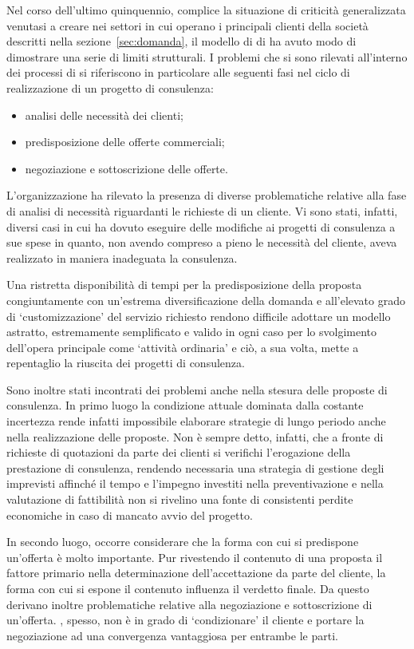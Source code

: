Nel corso dell'ultimo quinquennio, complice la situazione di criticità generalizzata venutasi a creare nei settori in cui operano i principali clienti della società descritti nella sezione~\ref{sec:domanda}, il modello di \bsn di \customer ha avuto modo di dimostrare una serie di limiti strutturali. I problemi che si sono rilevati all'interno dei processi di \customer si riferiscono in particolare alle seguenti fasi nel ciclo di realizzazione di un progetto di consulenza:
\begin{itemize}
	\item analisi delle necessità dei clienti;
	\item predisposizione delle offerte commerciali;
	\item negoziazione e sottoscrizione delle offerte.
\end{itemize}
  
L'organizzazione ha rilevato la presenza di diverse problematiche relative alla fase di analisi di necessità riguardanti le richieste di un cliente. Vi sono stati, infatti, diversi casi in cui \customer  ha dovuto eseguire delle modifiche ai progetti di consulenza a sue spese in quanto, non avendo compreso a pieno le necessità del cliente, aveva realizzato in maniera inadeguata la consulenza.

Una ristretta disponibilità di tempi per la predisposizione della proposta congiuntamente con un'estrema diversificazione della domanda e all'elevato grado di `customizzazione' del servizio richiesto rendono difficile adottare un modello astratto, estremamente semplificato e valido in ogni caso per lo svolgimento dell'opera principale come `attività ordinaria' e ciò, a sua volta, mette a repentaglio la riuscita dei progetti di consulenza.

Sono inoltre stati incontrati dei problemi anche nella stesura delle proposte di consulenza. In primo luogo la condizione attuale dominata dalla costante incertezza rende infatti impossibile elaborare strategie di lungo periodo anche nella realizzazione delle proposte. Non è sempre detto, infatti, che a fronte di richieste di quotazioni da parte dei clienti si verifichi l'erogazione della prestazione di consulenza, rendendo necessaria una strategia di gestione degli imprevisti affinché il tempo e l'impegno investiti nella preventivazione e nella valutazione di fattibilità non si rivelino una fonte di consistenti perdite economiche in caso di mancato avvio del progetto.

In secondo luogo, occorre considerare che la forma con cui si predispone un'offerta è molto importante. Pur rivestendo il contenuto di una proposta il fattore primario nella determinazione dell'accettazione da parte del cliente, la forma con cui si espone il contenuto influenza il verdetto finale. Da questo derivano inoltre problematiche relative alla negoziazione e sottoscrizione di un'offerta. \customer, spesso, non è in grado di `condizionare' il cliente e portare la negoziazione ad una convergenza vantaggiosa per entrambe le parti.

